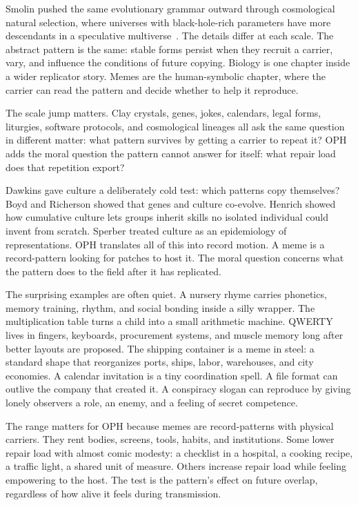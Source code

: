 \documentclass[11pt]{article}
\theoremstyle{remark}
\theoremstyle{plain}
\begin{document}
Smolin pushed the same evolutionary grammar outward through cosmological
natural selection, where universes with black-hole-rich parameters have more
descendants in a speculative multiverse~\cite{Smolin1997}. The details differ
at each scale. The abstract pattern is the same: stable forms persist when they
recruit a carrier, vary, and influence the conditions of future copying.
Biology is one chapter inside a wider replicator story. Memes are the
human-symbolic chapter, where the carrier can read the pattern and decide
whether to help it reproduce.

The scale jump matters. Clay crystals, genes, jokes, calendars, legal forms,
liturgies, software protocols, and cosmological lineages all ask the same
question in different matter: what pattern survives by getting a carrier to
repeat it? OPH adds the moral question the pattern cannot answer for itself:
what repair load does that repetition export?

Dawkins gave culture a deliberately cold test: which patterns copy themselves?
Boyd and Richerson showed that genes and culture co-evolve. Henrich showed how
cumulative culture lets groups inherit skills no isolated individual could
invent from scratch. Sperber treated culture as an epidemiology of
representations. OPH translates all of this into record motion. A meme is a
record-pattern looking for patches to host it. The moral question concerns what
the pattern does to the field after it has replicated.

The surprising examples are often quiet. A nursery rhyme carries phonetics,
memory training, rhythm, and social bonding inside a silly wrapper. The
multiplication table turns a child into a small arithmetic machine. QWERTY lives
in fingers, keyboards, procurement systems, and muscle memory long after better
layouts are proposed. The shipping container is a meme in steel: a standard
shape that reorganizes ports, ships, labor, warehouses, and city economies. A
calendar invitation is a tiny coordination spell. A file format can outlive the
company that created it. A conspiracy slogan can reproduce by giving lonely
observers a role, an enemy, and a feeling of secret competence.

The range matters for OPH because memes are record-patterns with physical
carriers. They rent bodies, screens, tools, habits, and institutions. Some lower
repair load with almost comic modesty: a checklist in a hospital, a cooking
recipe, a traffic light, a shared unit of measure. Others increase repair load
while feeling empowering to the host. The test is the pattern's effect on future
overlap, regardless of how alive it feels during transmission.
\end{document}
